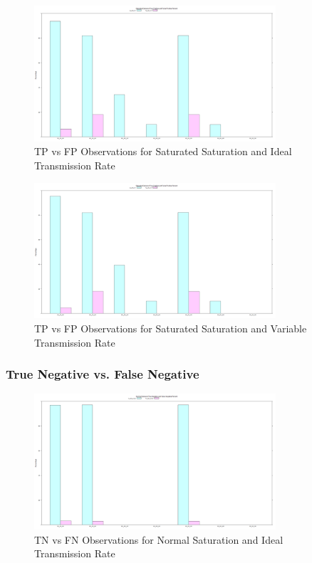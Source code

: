 	\begin{figure}[H]
	\centering
	\includegraphics[width=0.8\textwidth]{Chap7/figures/plots/saturated_ideal/tpvsfp_percent.png}
	\caption{TP vs FP Observations for Saturated Saturation and Ideal Transmission Rate}
	\label{fig:sim:res:sat:ideal:tpfp}
	\end{figure}

	\begin{figure}[H]
	\centering
	\includegraphics[width=0.8\textwidth]{Chap7/figures/plots/saturated_variable/tpvsfp_percent.png}
	\caption{TP vs FP Observations for Saturated Saturation and Variable Transmission Rate}
	\label{fig:sim:res:sat:variable:tpfp}
	\end{figure}
\subsubsection{True Negative vs. False Negative}
	
	\begin{figure}[H]
	\centering
	\includegraphics[width=0.8\textwidth]{Chap7/figures/plots/normal_ideal/tnvsfn_percent.png}
	\caption{TN vs FN Observations for Normal Saturation and Ideal Transmission Rate}
	\label{fig:sim:res:norm:ideal:tnfn}
	\end{figure}

